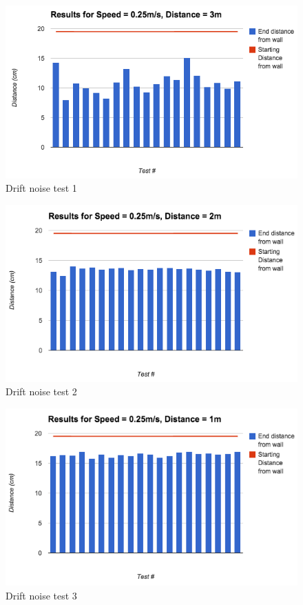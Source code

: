 \documentclass{article}
\begin{document}
\begin{multicols}{2}
	\begin{figure}[H]
	\begin{center}
	\includegraphics[width=0.9\linewidth]{ExperimentalResults4}
	\caption{Drift noise test 1}
	\end{center}
	\end{figure}
	\begin{figure}[H]
	\begin{center}
	\includegraphics[width=0.9\linewidth]{ExperimentalResults5}
	\caption{Drift noise test 2}
	\end{center}
	\end{figure}
	\begin{figure}[H]
	\begin{center}
	\includegraphics[width=0.9\linewidth]{ExperimentalResults6}
	\caption{Drift noise test 3}
	\end{center}
	\end{figure}
	

\end{multicols}
\end{document}

